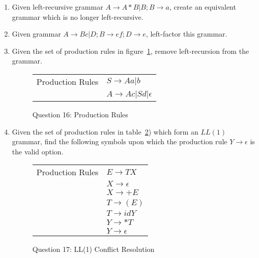 \documentclass[10pt, oneside, letterpaper]{article}
\begin{document}
\begin{enumerate}
		\clearpage
		
		\item Given left-recursive grammar $A \rightarrow A * B | B; B \rightarrow a$, create an equivalent grammar which is no longer left-recursive.

		\clearpage
		
		\item Given grammar $A \rightarrow Bc | D; B \rightarrow ef; D \rightarrow e$, left-factor this grammar.

		\clearpage
		
		\item Given the set of production rules in figure~\ref{tab:q16-production-rules}, remove left-recursion from the grammar.

\begin{figure}[!htb]
	\caption{Question 16: Production Rules}
	\label{tab:q16-production-rules}
	\begin{center}
		\begin{tabular}{ r | l }
			Production Rules
			& $S \rightarrow Aa | b$ \\
			& $A \rightarrow Ac | Sd | \epsilon$ \\
		\end{tabular}
	\end{center}
\end{figure}

		\clearpage
		
		\item Given the set of production rules in table~\ref{tab:q-ll1-conflict-resolution}) which form an $LL(1)$ grammar, find the following symbols upon which the production rule $Y \rightarrow \epsilon$ is the valid option.

\begin{figure}[!htb]
	\caption{Question 17: LL(1) Conflict Resolution}
	\label{tab:q-ll1-conflict-resolution}
	\begin{center}
		\begin{tabular}{ r l }
			Production Rules
			& $E \rightarrow TX$ \\
			& $X \rightarrow \epsilon$ \\
			& $X \rightarrow +E$ \\
			& $T \rightarrow (E)$ \\
			& $T \rightarrow id Y$ \\
			& $Y \rightarrow *T$ \\
			& $Y \rightarrow \epsilon $
		\end{tabular}
	\end{center}
\end{figure}
		
	\end{enumerate}
		
	\vspace{2cm}
\end{document}
